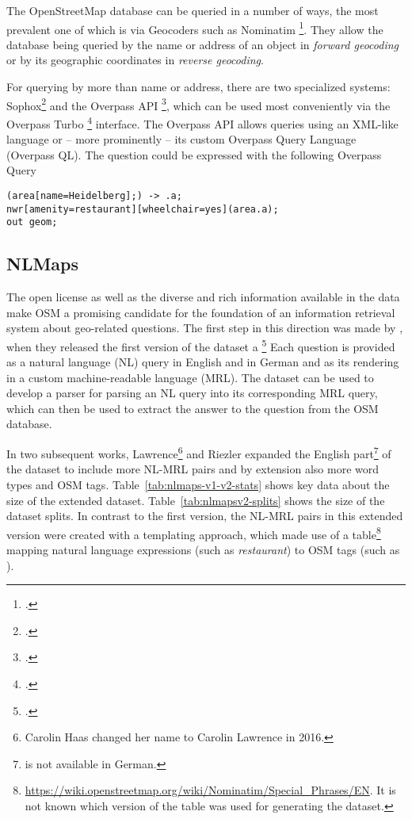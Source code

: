 The OpenStreetMap database can be queried in a number of ways, the most
prevalent one of which is via Geocoders such as Nominatim \footcite{nominatim}.
They allow the database being queried by the name or address of an object in
\emph{forward geocoding} or by its geographic coordinates in \emph{reverse
  geocoding}.

For querying by more than name or address, there are two specialized systems:
Sophox\footcite[The official website at \url{https://sophox.org} is offline as
of December 2020]{sophox} and the Overpass API \footcite{overpass-api}, which
can be used most conveniently via the Overpass Turbo \footcite{overpass-turbo}
interface. The Overpass API allows queries using an XML-like language or – more
prominently – its custom Overpass Query Language (Overpass QL). The question
 could be
expressed with the following Overpass Query

\begin{lstlisting}[style=MyOverpassQL,title={Overpass QL for wheelchair-accessible restaurants in Heidelberg}]
(area[name=Heidelberg];) -> .a;
nwr[amenity=restaurant][wheelchair=yes](area.a);
out geom;
\end{lstlisting}

\subsection{NLMaps}
\label{sec:nlmaps}

The open license as well as the diverse and rich information available in the
data make OSM a promising candidate for the foundation of an information
retrieval system about geo-related questions. The first step in this direction
was made by \textcite{haas-2016}, when they released the first version of the
\nlmaps{} dataset a \footcite{nlmaps} Each question is provided as a natural language
(NL) query in English and in German and as its rendering in a custom
machine-readable language (MRL). The dataset can be used to develop a parser for
parsing an NL query into its corresponding MRL query, which can then be used to
extract the answer to the question from the OSM database.

In two subsequent works, Lawrence\footnote{Carolin Haas changed her name to
  Carolin Lawrence in 2016.} and Riezler
\parencites*{lawrence-2016}{lawrence-2018} expanded the English
part\footnote{\nlmapstwo{} is not available in German.} of the dataset to
include more NL-MRL pairs and by extension also more word types and OSM tags.
Table~\ref{tab:nlmaps-v1-v2-stats} shows key data about the size of the extended
dataset. Table~\ref{tab:nlmapsv2-splits} shows the size of the dataset splits.
In contrast to the first version, the NL-MRL pairs in this extended version were
created with a templating approach, which made use of a
table\footnote{\url{https://wiki.openstreetmap.org/wiki/Nominatim/Special_Phrases/EN}.
  It is not known which version of the table was used for generating the
  \nlmapstwo{} dataset.} mapping natural language expressions (such as
\emph{restaurant}) to OSM tags (such as ).

